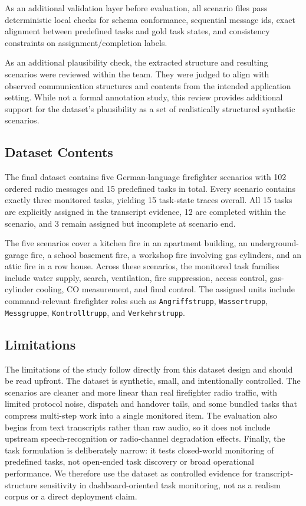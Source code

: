 As an additional validation layer before evaluation, all scenario files pass deterministic local checks for schema conformance, sequential message ids, exact alignment between predefined tasks and gold task states, and consistency constraints on assignment/completion labels.

As an additional plausibility check, the extracted structure and resulting scenarios were reviewed within the team. They were judged to align with observed communication structures and contents from the intended application setting. While not a formal annotation study, this review provides additional support for the dataset's plausibility as a set of realistically structured synthetic scenarios.

\subsection{Dataset Contents}

The final dataset contains five German-language firefighter scenarios with 102 ordered radio messages and 15 predefined tasks in total. Every scenario contains exactly three monitored tasks, yielding 15 task-state traces overall. All 15 tasks are explicitly assigned in the transcript evidence, 12 are completed within the scenario, and 3 remain assigned but incomplete at scenario end.

The five scenarios cover a kitchen fire in an apartment building, an underground-garage fire, a school basement fire, a workshop fire involving gas cylinders, and an attic fire in a row house. Across these scenarios, the monitored task families include water supply, search, ventilation, fire suppression, access control, gas-cylinder cooling, CO measurement, and final control. The assigned units include command-relevant firefighter roles such as \texttt{Angriffstrupp}, \texttt{Wassertrupp}, \texttt{Messgruppe}, \texttt{Kontrolltrupp}, and \texttt{Verkehrstrupp}.

\subsection{Limitations}

The limitations of the study follow directly from this dataset design and should be read upfront. The dataset is synthetic, small, and intentionally controlled. The scenarios are cleaner and more linear than real firefighter radio traffic, with limited protocol noise, dispatch and handover tails, and some bundled tasks that compress multi-step work into a single monitored item. The evaluation also begins from text transcripts rather than raw audio, so it does not include upstream speech-recognition or radio-channel degradation effects. Finally, the task formulation is deliberately narrow: it tests closed-world monitoring of predefined tasks, not open-ended task discovery or broad operational performance. We therefore use the dataset as controlled evidence for transcript-structure sensitivity in dashboard-oriented task monitoring, not as a realism corpus or a direct deployment claim.
